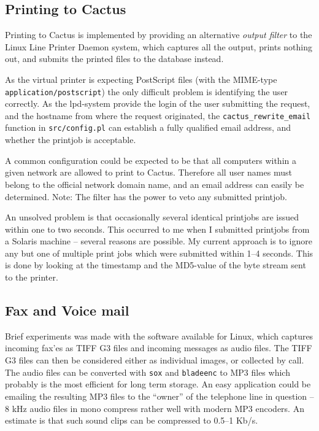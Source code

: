 \subsection{Printing to Cactus}

Printing to Cactus is implemented by providing an alternative
\textit{output filter} to the Linux Line Printer Daemon system, which
captures all the output, prints nothing out, and submits the printed
files to the database instead.

As the virtual printer is expecting PostScript files (with the
MIME-type \texttt{application/postscript}) the only difficult problem
is identifying the user correctly.  As the lpd-system provide the
login of the user submitting the request, and the hostname from where
the request originated, the \texttt{cactus_rewrite_email} function in
\texttt{src/config.pl} can establish a fully qualified email address,
and whether the printjob is acceptable.

A common configuration could be expected to be that all computers
within a given network are allowed to print to Cactus.  Therefore all
user names must belong to the official network domain name, and an
email address can easily be determined.  Note:  The filter has the
power to veto any submitted printjob.

An unsolved problem is that occasionally several identical printjobs
are issued within one to two seconds.  This occurred to me when I
submitted printjobs from a Solaris machine -- several reasons are
possible.  My current approach is to ignore any but one of multiple
print jobs which were submitted within 1--4 seconds.  This is done by
looking at the timestamp and the MD5-value of the byte stream sent to
the printer.


\subsection{Fax and Voice mail}

Brief experiments was made with the
software available for Linux, which captures incoming fax'es as TIFF
G3 files and incoming messages as audio files.  The TIFF G3 files can
then be considered either as individual images, or collected by call.
The audio files can be converted with \texttt{sox} and
\texttt{bladeenc} to MP3 files which probably is the most efficient
for long term storage.  An easy application could be emailing the
resulting MP3 files to the ``owner'' of the telephone line in
question -- 8 kHz audio files in mono compress rather well with modern
MP3 encoders.  An estimate is that such sound clips can be compressed
to 0.5--1 Kb/s.

